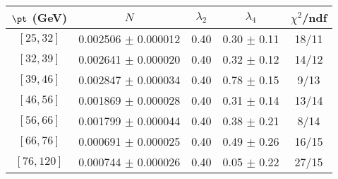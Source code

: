 \begin{tabular}{c||c|c|c|c}
$\pt$ (GeV) & $N$ & $\lambda_{2}$ & $\lambda_4$  & $\chi^2$/ndf  \\
\hline
$[25, 32]$ & 0.002506 $\pm$ 0.000012 & 0.40 & 0.30 $\pm$ 0.11 & 18/11\\
$[32, 39]$ & 0.002641 $\pm$ 0.000020 & 0.40 & 0.32 $\pm$ 0.12 & 14/12\\
$[39, 46]$ & 0.002847 $\pm$ 0.000034 & 0.40 & 0.78 $\pm$ 0.15 & 9/13\\
$[46, 56]$ & 0.001869 $\pm$ 0.000028 & 0.40 & 0.31 $\pm$ 0.14 & 13/14\\
$[56, 66]$ & 0.001799 $\pm$ 0.000044 & 0.40 & 0.38 $\pm$ 0.21 & 8/14\\
$[66, 76]$ & 0.000691 $\pm$ 0.000025 & 0.40 & 0.49 $\pm$ 0.26 & 16/15\\
$[76, 120]$ & 0.000744 $\pm$ 0.000026 & 0.40 & 0.05 $\pm$ 0.22 & 27/15\\
\end{tabular}
